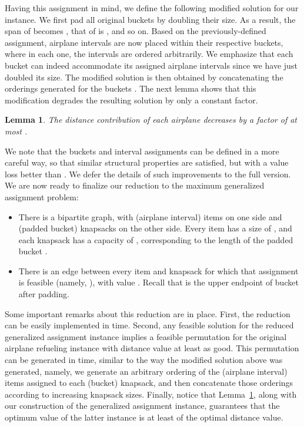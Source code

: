 \documentclass[11pt]{article}
\theoremstyle{plain}
\newtheorem{lemma}[theorem]{Lemma}
\theoremstyle{definition}
\begin{document}
Having this assignment in mind, we define the following modified solution for our instance. We first pad all original buckets by doubling their size. As a result, the span of  becomes , that of  is , and so on. Based on the previously-defined assignment, airplane intervals are now placed within their respective buckets, where in each one, the intervals are ordered arbitrarily. We emphasize that each bucket can indeed accommodate its assigned airplane intervals since we have just doubled its size. The modified solution is then obtained by concatenating the orderings generated for the buckets . The next lemma shows that this modification degrades the resulting solution by only a constant factor.

\begin{lemma} \label{lemma:reduction}
The distance contribution of each airplane decreases by a factor of at most .
\end{lemma}

We note that the buckets and interval assignments can be defined in a more careful way, so that similar structural properties are satisfied, but with a value loss better than . We defer the details of such improvements to the full version. We are now ready to finalize our reduction to the maximum generalized assignment problem:
\begin{itemize}
\item There is a bipartite graph, with  (airplane interval) items on one side and  (padded bucket) knapsacks on the other side. Every item  has a size of , and each knapsack  has a capacity of , corresponding to the length of the padded bucket .

\item There is an edge between every item  and knapsack  for which that assignment is feasible (namely, ), with value . Recall that  is the upper endpoint of bucket  after padding.
\end{itemize}

Some important remarks about this reduction are in place. First, the reduction can be easily implemented in  time. Second, any feasible solution for the reduced generalized assignment instance implies a feasible permutation for the original airplane refueling instance with distance value at least as good. This permutation can be generated in  time, similar to the way the modified solution above was generated, namely, we generate an arbitrary ordering of the (airplane interval) items assigned to each (bucket) knapsack, and then concatenate those orderings according to increasing knapsack sizes. Finally, notice that Lemma~\ref{lemma:reduction}, along with our construction of the generalized assignment instance, guarantees that the optimum value of the latter instance is at least  of the optimal distance value. 
\end{document}
